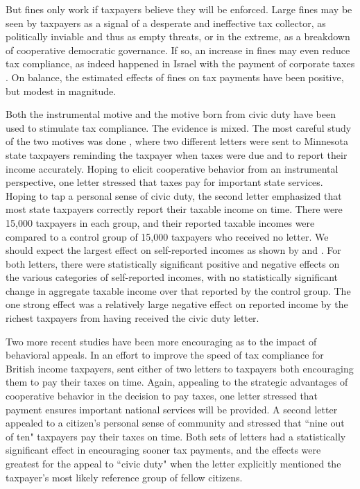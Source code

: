 \documentclass[12pt]{article}
\begin{document}
But fines only work if taxpayers believe they will be enforced.  Large
fines may be seen by taxpayers as a signal of a desperate and
ineffective tax collector, as politically inviable and thus as empty
threats, or in the extreme, as a breakdown of cooperative democratic
governance.  If so, an increase in fines may even reduce tax
compliance, as indeed happened in Israel with the payment of corporate
taxes \cite{Ariel-12}.  On balance, the estimated effects of fines
on tax payments have been positive, but modest in magnitude.

Both the instrumental motive and the motive born from civic duty have
been used to stimulate tax compliance.  The evidence is mixed.  The
most careful study of the two motives was done , 
where two different letters were sent to Minnesota state
taxpayers reminding the taxpayer when taxes were due and to report
their income accurately.  Hoping to elicit cooperative behavior from
an instrumental perspective, one letter stressed that taxes pay for
important state services.  Hoping to tap a personal sense of civic
duty, the second letter emphasized that most state taxpayers correctly
report their taxable income on time.  There were 15,000 taxpayers in
each group, and their reported taxable incomes were compared to a
control group of 15,000 taxpayers who received no letter.  We should
expect the largest effect on self-reported incomes as shown by 
 and .  For both letters, there were
statistically significant positive and negative effects on the various
categories of self-reported incomes, with no statistically significant
change in aggregate taxable income over that reported by the control
group.  The one strong effect was a relatively large negative effect
on reported income by the richest taxpayers from having received the
civic duty letter.

Two more recent studies have been more encouraging as to the impact
of behavioral appeals. In an effort to improve the speed of tax
compliance for British income taxpayers,  sent
either of two letters to taxpayers both encouraging them to pay their
taxes on time.  Again, appealing to the strategic advantages of
cooperative behavior in the decision to pay taxes, one letter stressed
that payment ensures important national services will be provided.  A
second letter appealed to a citizen's personal sense of community and
stressed that ``nine out of ten" taxpayers pay their taxes on time.
Both sets of letters had a statistically significant effect in
encouraging sooner tax payments, and the effects were greatest for the
appeal to ``civic duty" when the letter explicitly mentioned the 
taxpayer's most likely reference group of fellow citizens.
\end{document}
